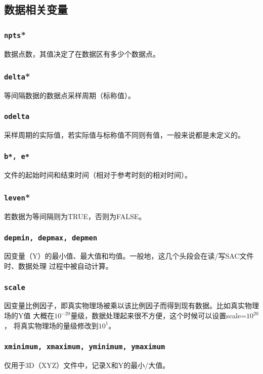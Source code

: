 \subsection{数据相关变量}
\subsubsection{\texttt{npts}*}
数据点数，其值决定了在数据区有多少个数据点。

\subsubsection{\texttt{delta}*}
等间隔数据的数据点采样周期（标称值）。

\subsubsection{\texttt{odelta}}
采样周期的实际值，若实际值与标称值不同则有值，一般来说都是未定义的。

\subsubsection{\texttt{b*, e*}}
文件的起始时间和结束时间（相对于参考时刻的相对时间）。

\subsubsection{\texttt{leven}*}
若数据为等间隔则为TRUE，否则为FALSE。

\subsubsection{\texttt{depmin, depmax, depmen}}
因变量（Y）的最小值、最大值和均值。一般地，这几个头段会在读/写SAC文件时、数据处理
过程中被自动计算。

\subsubsection{\texttt{scale}}
因变量比例因子，即真实物理场被乘以该比例因子而得到现有数据。比如真实物理场的Y值
大概在$10^{-20}$量级，数据处理起来很不方便，这个时候可以设置scale=$10^{20}$，
将真实物理场的量级修改到$10^1$。

\subsubsection{\texttt{xminimum, xmaximum, yminimum, ymaximum}}
仅用于3D（XYZ）文件中，记录X和Y的最小/大值。

